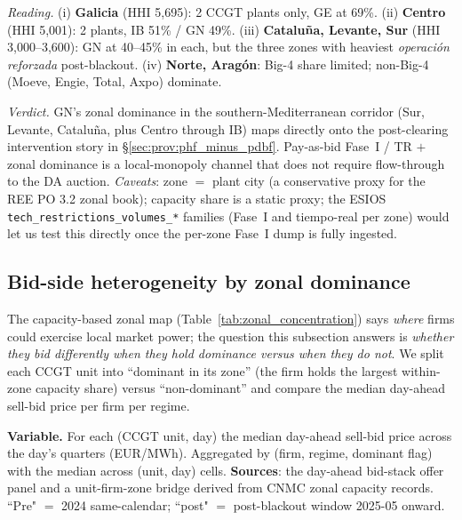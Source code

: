 \documentclass[11pt,a4paper]{article}
\begin{document}
\textit{Reading.} (i) \textbf{Galicia} (HHI 5{,}695): 2 CCGT plants only, GE at 69\%. (ii) \textbf{Centro} (HHI 5{,}001): 2 plants, IB 51\% / GN 49\%. (iii) \textbf{Cataluña, Levante, Sur} (HHI 3{,}000--3{,}600): GN at 40--45\% in each, but the three zones with heaviest \emph{operación reforzada} post-blackout. (iv) \textbf{Norte, Aragón}: Big-4 share limited; non-Big-4 (Moeve, Engie, Total, Axpo) dominate.

\textit{Verdict.} GN's zonal dominance in the southern-Mediterranean corridor (Sur, Levante, Cataluña, plus Centro through IB) maps directly onto the post-clearing intervention story in \S\ref{sec:prov:phf_minus_pdbf}. Pay-as-bid Fase~I / TR $+$ zonal dominance is a local-monopoly channel that does not require flow-through to the DA auction. \emph{Caveats}: zone $=$ plant city (a conservative proxy for the REE PO 3.2 zonal book); capacity share is a static proxy; the ESIOS \texttt{tech\_restrictions\_volumes\_*} families (Fase~I and tiempo-real per zone) would let us test this directly once the per-zone Fase~I dump is fully ingested.

\subsection{Bid-side heterogeneity by zonal dominance}\label{sec:prov:geo:bid_by_dominance}

The capacity-based zonal map (Table~\ref{tab:zonal_concentration}) says \emph{where} firms could exercise local market power; the question this subsection answers is \emph{whether they bid differently when they hold dominance versus when they do not}. We split each CCGT unit into ``dominant in its zone'' (the firm holds the largest within-zone capacity share) versus ``non-dominant'' and compare the median day-ahead sell-bid price per firm per regime.

\textbf{Variable.} For each (CCGT unit, day) the median day-ahead sell-bid price across the day's quarters (EUR/MWh). Aggregated by (firm, regime, dominant flag) with the median across (unit, day) cells. \textbf{Sources}: the day-ahead bid-stack offer panel and a unit-firm-zone bridge derived from CNMC zonal capacity records. ``Pre" $=$ 2024 same-calendar; ``post" $=$ post-blackout window 2025-05 onward.
\end{document}
